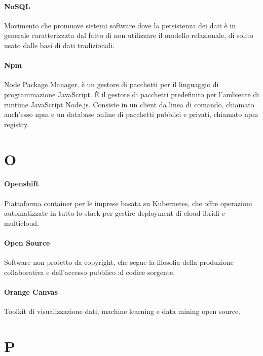 \documentclass[]{article}
\begin{document}
	\paragraph*{NoSQL}
	Movimento che promuove sistemi software dove la persistenza dei dati è in generale caratterizzata dal fatto di non utilizzare il modello relazionale, di solito usato dalle basi di dati tradizionali.

	\paragraph*{Npm}
	Node Package Manager, è un gestore di pacchetti per il linguaggio di programmazione JavaScript. È il gestore di pacchetti predefinito per l'ambiente di runtime JavaScript Node.js. Consiste in un client da linea di comando, chiamato anch'esso npm e un database online di pacchetti pubblici e privati, chiamato npm registry.

	\newpage

	\section*{O}

	\paragraph*{Openshift}
	Piattaforma container per le imprese basata su Kubernetes, che offre operazioni automatizzate in tutto lo stack per gestire deployment di cloud ibridi e multicloud.

	\paragraph*{Open Source}
	Software non protetto da copyright, che segue la filosofia della produzione collaborativa e dell'accesso pubblico al codice sorgente.

	\paragraph*{Orange Canvas}
	Toolkit di visualizzazione dati, machine learning e data mining open source.

	\newpage

	\section*{P}
\end{document}

